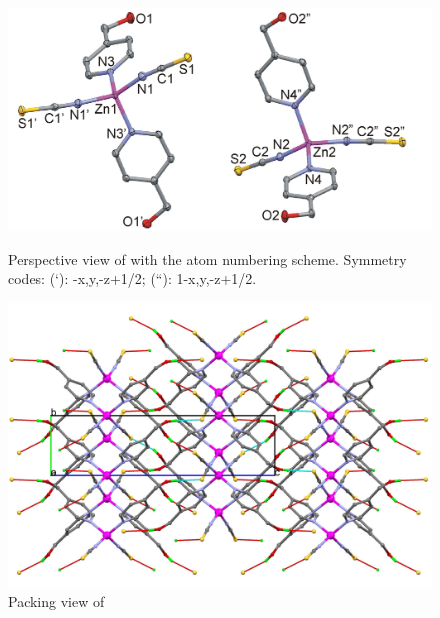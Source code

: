 \begin{figure}[!htpb]
\centering
\includegraphics[width=1\textwidth]{figures/ZnR_4OMP_FIGm11.png}
\caption[Perspective view of ]{Perspective view of  with the atom numbering scheme. 
Symmetry codes: (‘): -x,y,-z+1/2; (“): 1-x,y,-z+1/2.}
\label{fig:ZnR4HOMP_pv}
\vspace{\floatsep}
\includegraphics[width=1\textwidth]{figures/znr_4omp_CA.png}
\caption{Packing view of }
\label{fig:ZnR4HOMP_packv}
\end{figure}

